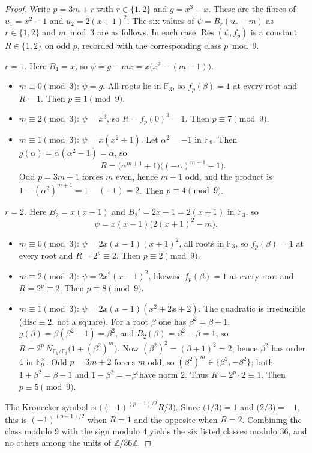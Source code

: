 \documentclass[11pt,a4paper]{amsart}
\newcommand{\F}{\mathbb{F}}
\newcommand{\Z}{\mathbb{Z}}
\newcommand{\Res}{\operatorname{Res}}
\theoremstyle{plain}
\theoremstyle{definition}
\begin{document}
\begin{proof}
Write \(p=3m+r\) with \(r\in\{1,2\}\) and \(g=x^3-x\). These are the fibres of \(u_1=x^2-1\) and \(u_2=2(x+1)^2\). The six values of \(\psi=B_r(u_r-m)\) as \(r\in\{1,2\}\) and \(m\bmod 3\) are as follows. In each case \(\Res(\psi,f_p)\) is a constant \(R\in\{1,2\}\) on odd \(p\), recorded with the corresponding class \(p\bmod 9\).

\textit{\(r=1\).} Here \(B_1=x\), so \(\psi=g-mx=x\bigl(x^2-(m+1)\bigr)\).
\begin{itemize}
\item \(m\equiv0\pmod3\): \(\psi=g\). All roots lie in \(\F_3\), so \(f_p(\beta)=1\) at every root and \(R=1\). Then \(p\equiv1\pmod9\).
\item \(m\equiv2\pmod3\): \(\psi=x^3\), so \(R=f_p(0)^3=1\). Then \(p\equiv7\pmod9\).
\item \(m\equiv1\pmod3\): \(\psi=x(x^2+1)\). Let \(\alpha^2=-1\) in \(\F_9\). Then \(g(\alpha)=\alpha(\alpha^2-1)=\alpha\), so
    \[
    R=\bigl(\alpha^{m+1}+1\bigr)\bigl((-\alpha)^{m+1}+1\bigr).
    \]
    Odd \(p=3m+1\) forces \(m\) even, hence \(m+1\) odd, and the product is \(1-(\alpha^2)^{m+1}=1-(-1)=2\). Then \(p\equiv4\pmod9\).
\end{itemize}

\textit{\(r=2\).} Here \(B_2=x(x-1)\) and \(B_2'=2x-1=2(x+1)\) in \(\F_3\), so
\[
\psi=x(x-1)\bigl(2(x+1)^2-m\bigr).
\]
\begin{itemize}
\item \(m\equiv0\pmod3\): \(\psi=2x(x-1)(x+1)^2\), all roots in \(\F_3\), so \(f_p(\beta)=1\) at every root and \(R=2^p\equiv2\). Then \(p\equiv2\pmod9\).
\item \(m\equiv2\pmod3\): \(\psi=2x^2(x-1)^2\), likewise \(f_p(\beta)=1\) at every root and \(R=2^p\equiv2\). Then \(p\equiv8\pmod9\).
\item \(m\equiv1\pmod3\): \(\psi=2x(x-1)(x^2+2x+2)\). The quadratic is irreducible (\(\mathrm{disc}\equiv2\), not a square). For a root \(\beta\) one has \(\beta^2=\beta+1\), \(g(\beta)=\beta(\beta^2-1)=\beta^2\), and \(B_2(\beta)=\beta^2-\beta=1\), so \(R=2^p\,N_{\F_9/\F_3}\bigl(1+(\beta^2)^m\bigr)\). Now \((\beta^2)^2=(\beta+1)^2=2\), hence \(\beta^2\) has order \(4\) in \(\F_9^\times\). Odd \(p=3m+2\) forces \(m\) odd, so \((\beta^2)^m\in\{\beta^2,-\beta^2\}\); both \(1+\beta^2=\beta-1\) and \(1-\beta^2=-\beta\) have norm \(2\). Thus \(R=2^p\cdot2\equiv1\). Then \(p\equiv5\pmod9\).
\end{itemize}

The Kronecker symbol is \(\bigl((-1)^{(p-1)/2}R/3\bigr)\). Since \(\bigl(1/3\bigr)=1\) and \(\bigl(2/3\bigr)=-1\), this is \((-1)^{(p-1)/2}\) when \(R=1\) and the opposite when \(R=2\). Combining the class modulo \(9\) with the sign modulo \(4\) yields the six listed classes modulo \(36\), and no others among the units of \(\Z/36\Z\).
\end{proof}
\end{document}

